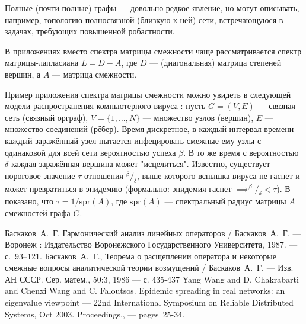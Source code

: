 \documentclass[11pt]{article}
\begin{document}
Полные (почти полные) графы --- довольно редкое явление,
но могут описывать, например, топологию полносвязной (близкую к ней) сети,
встречающуюся в задачах, требующих повышенной робастности.

В приложениях вместо спектра матрицы смежности чаще рассматривается
спектр матрицы-лапласиана \( L = D - A \),
где \( D \) --- (диагональная) матрица степеней вершин,
а \( A \) --- матрица смежности.

Пример приложения спектра матрицы смежности можно увидеть
в следующей модели распространения компьютерного вируса \cite{epidemic-eigenvalues}:
пусть \( G = (V, E) \) --- связная сеть (связный орграф),
\( V = \{1, \ldots, N\} \) --- множество узлов (вершин),
\( E \) --- множество соединений (рёбер).
Время дискретное, в каждый интервал времени каждый заражённый узел
пытается инфецировать смежные ему узлы с одинаковой для всей сети вероятностью успеха \( \beta \).
В то же время с вероятностью \( \delta \) каждая заражённая вершина может "исцелиться".
Известно, существует пороговое значение \( \tau \) отношения \( {^\beta}/_{\delta} \),
выше которого вспышка вируса не гаснет и может превратиться в эпидемию
(формально: эпидемия гаснет \( \implies ^{\beta}/_{\delta} < \tau \)).
В \cite{epidemic-eigenvalues} показано, что \( \tau = 1/\mathrm{spr}\left({A}\right) \),
где \( \mathrm{spr}\left({A}\right) \) --- спектральный радиус матрицы \( A \) смежностей графа \( G \).
\begin{thebibliography}{9}
  Баскаков~А.~Г. Гармонический анализ линейных операторов
    / Баскаков~А.~Г.
    --- Воронеж : Издательство Воронежского Государственного Университета,
        1987.
    ---  с.~93--121.
 Баскаков~А.~Г., Теорема о расщеплении оператора и некоторые смежные вопросы аналитической теории возмущений
    / Баскаков~А.~Г.
    --- Изв. АН СССР. Сер. матем., 50:3, 1986
    --- с. 435-437
  Yang Wang and D. Chakrabarti and Chenxi Wang and C. Faloutsos.
    Epidemic spreading in real networks: an eigenvalue viewpoint
        --- 22nd International Symposium on Reliable Distributed Systems, Oct 2003. Proceedings., --- pages~25-34.
\end{thebibliography}
\end{document}
